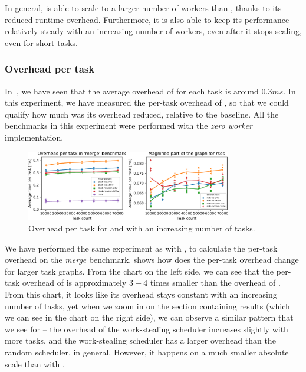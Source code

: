 In general, \rsds{} is able to scale to a larger number of workers than
\dask{}, thanks to its reduced runtime overhead. Furthermore, it is also able
to keep its performance relatively steady with an increasing number of workers, even after it stops
scaling, even for short tasks.

\subsubsection*{Overhead per task}
In~, we have seen that the average overhead of
\dask{} for each task is around $0.3ms$. In this experiment,
we have measured the per-task overhead of \rsds{}, so that we could qualify how
much was its overhead reduced, relative to the baseline. All the benchmarks in this experiment were
performed with the \emph{zero worker} implementation.

\begin{figure}
	\centering
	\includegraphics[width=0.8\textwidth]{./imgs/rsds/charts/rsds-merge-task-scaling}
	\caption{Overhead per task for \rsds{} and \dask{} with an
	increasing number of tasks.}
	\label{fig:rsds-merge-task-scaling}
\end{figure}

We have performed the same experiment as with \dask{}, to calculate the
per-task overhead on the \emph{merge} benchmark.  shows
how does the per-task overhead change for larger task graphs. From the chart on the left side, we
can see that the per-task overhead of \rsds{} is approximately
$3-4$ times smaller than the overhead of \dask{}. From
this chart, it looks like its overhead stays constant with an increasing number of tasks, yet when
we zoom in on the section containing \rsds{} results (which we can see in the
chart on the right side), we can observe a similar pattern that we see for
\dask{} -- the overhead of the work-stealing scheduler increases slightly with
more tasks, and the work-stealing scheduler has a larger overhead than the random scheduler, in
general. However, it happens on a much smaller absolute scale than with
\dask{}.

